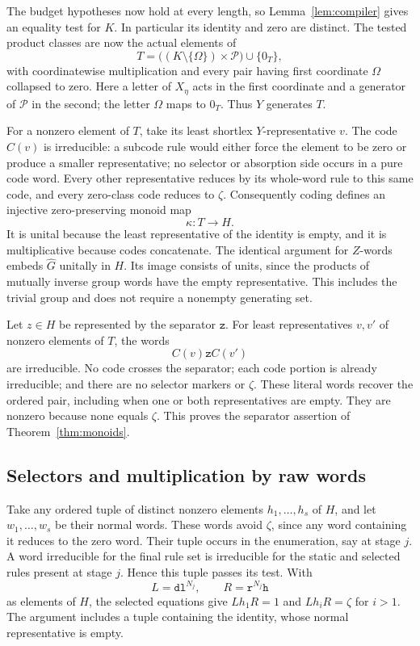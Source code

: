 The budget hypotheses now hold at every length, so
Lemma~\ref{lem:compiler} gives an equality test for $K$.  In
particular its identity and zero are distinct.  The tested product
classes are now the actual elements of
\[
 T=\bigl((K\setminus\{\Omega\})\times\mathcal P\bigr)\cup\{0_T\},
\]
with coordinatewise multiplication and every pair having first
coordinate $\Omega$ collapsed to zero.
Here a letter of $X_\eta$ acts in the first coordinate and a
generator of $\mathcal P$ in the second; the letter $\Omega$ maps to
$0_T$.  Thus $Y$ generates $T$.

For a nonzero element of $T$, take its least shortlex $Y$-representative
$v$.  The code $C(v)$ is irreducible: a subcode rule would either
force the element to be zero or produce a smaller representative;
no selector or absorption side occurs in a pure code word.
Every other representative reduces by its whole-word rule to this
same code, and every zero-class code reduces to $\zeta$.
Consequently coding defines an injective zero-preserving monoid map
\[
 \kappa:T\longrightarrow H.
\]
It is unital because the least representative of the identity is
empty, and it is multiplicative because codes concatenate.
The identical argument for $Z$-words embeds $\widehat G$ unitally in
$H$.  Its image consists of units, since the products of mutually
inverse group words have the empty representative.  This includes
the trivial group and does not require a nonempty generating set.

Let $z\in H$ be represented by the separator $\mathtt z$.
For least representatives $v,v'$ of nonzero elements of $T$, the words
\begin{equation}\label{eq:separator-words}
 C(v)\mathtt z C(v')
\end{equation}
are irreducible.  No code crosses the separator; each code portion
is already irreducible; and there are no selector markers or
$\zeta$.  These literal words recover the ordered pair, including
when one or both representatives are empty.  They are nonzero
because none equals $\zeta$.  This proves the separator assertion
of Theorem~\ref{thm:monoids}.

\subsection{Selectors and multiplication by raw words}

Take any ordered tuple of distinct nonzero elements
$h_1,\ldots,h_s$ of $H$, and let $w_1,\ldots,w_s$ be their normal
words.  These words avoid $\zeta$, since any word containing it
reduces to the zero word.  Their tuple occurs in the enumeration,
say at stage $j$.  A word irreducible for the final rule set is
irreducible for the static and selected rules present at stage $j$.
Hence this tuple passes its test.  With
\[
 L=\mathtt d\mathtt l^{N_j},\qquad
 R=\mathtt r^{N_j}\mathtt h
\]
as elements of $H$, the selected equations give
$Lh_1R=1$ and $Lh_iR=\zeta$ for $i>1$.  The argument includes a tuple
containing the identity, whose normal representative is empty.

